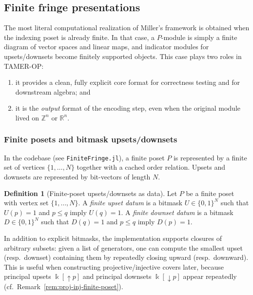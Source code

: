 \documentclass{article}
\newcommand{\kk}{\Bbbk}
\newcommand{\<}{\langle}
\renewcommand{\>}{\rangle}
\theoremstyle{definition}
\newtheorem{defn}[theorem]{Definition}
\theoremstyle{remark}
\begin{document}
	\subsection{Finite fringe presentations}\label{subsec:finite-fringe-presentations}
	
	The most literal computational realization of Miller's framework is obtained when the indexing poset is
	already finite.  In that case, a $P$-module is simply a finite diagram of vector spaces and linear maps, and
	indicator modules for upsets/downsets become finitely supported objects.  This case plays two roles in TAMER-OP:
	\begin{enumerate}[label=(\roman*)]
		\item it provides a clean, fully explicit core format for correctness testing and for downstream algebra; and
		\item it is the \emph{output} format of the encoding step, even when the original module lived on
		$\mathbb{Z}^n$ or $\mathbb{R}^n$.
	\end{enumerate}
	
	\subsubsection*{Finite posets and bitmask upsets/downsets}
	
	In the codebase (see \texttt{FiniteFringe.jl}), a finite poset $P$ is represented by a finite set of vertices
	$\{1,\dots,N\}$ together with a cached order relation.  Upsets and downsets are represented by bit-vectors of
	length $N$.
	
	\begin{defn}[Finite-poset upsets/downsets as data]\label{def:finite-upset-downset-data}
		Let $P$ be a finite poset with vertex set $\{1,\dots,N\}$.
		A \emph{finite upset datum} is a bitmask $U\in\{0,1\}^N$ such that
		$U(p)=1$ and $p\le q$ imply $U(q)=1$.
		A \emph{finite downset datum} is a bitmask $D\in\{0,1\}^N$ such that
		$D(q)=1$ and $p\le q$ imply $D(p)=1$.
	\end{defn}
	
	In addition to explicit bitmasks, the implementation supports closures of arbitrary subsets:
	given a list of generators, one can compute the smallest upset (resp.\ downset) containing them by repeatedly
	closing upward (resp.\ downward).  This is useful when constructing projective/injective covers later, because
	principal upsets $\kk[\uparrow p]$ and principal downsets $\kk[\downarrow p]$ appear repeatedly
	(cf.\ Remark~\ref{rem:proj-inj-finite-poset}).
	
\end{document}
